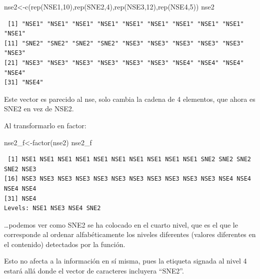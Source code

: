\documentclass[
  letterpaper,
  DIV=11,
  numbers=noendperiod]{scrreprt}
\newenvironment{Shaded}{\begin{snugshade}}{\end{snugshade}}
\newcommand{\DecValTok}[1]{\textcolor[rgb]{0.68,0.00,0.00}{#1}}
\newcommand{\FunctionTok}[1]{\textcolor[rgb]{0.28,0.35,0.67}{#1}}
\newcommand{\NormalTok}[1]{\textcolor[rgb]{0.00,0.23,0.31}{#1}}
\newcommand{\OtherTok}[1]{\textcolor[rgb]{0.00,0.23,0.31}{#1}}
\newcommand{\StringTok}[1]{\textcolor[rgb]{0.13,0.47,0.30}{#1}}
\begin{document}
\begin{Shaded}
\begin{Highlighting}[]
\NormalTok{nse2}\OtherTok{\textless{}{-}}\FunctionTok{c}\NormalTok{(}\FunctionTok{rep}\NormalTok{(}\StringTok{\textquotesingle{}NSE1\textquotesingle{}}\NormalTok{,}\DecValTok{10}\NormalTok{),}\FunctionTok{rep}\NormalTok{(}\StringTok{\textquotesingle{}SNE2\textquotesingle{}}\NormalTok{,}\DecValTok{4}\NormalTok{),}\FunctionTok{rep}\NormalTok{(}\StringTok{\textquotesingle{}NSE3\textquotesingle{}}\NormalTok{,}\DecValTok{12}\NormalTok{),}\FunctionTok{rep}\NormalTok{(}\StringTok{\textquotesingle{}NSE4\textquotesingle{}}\NormalTok{,}\DecValTok{5}\NormalTok{))}
\NormalTok{nse2}
\end{Highlighting}
\end{Shaded}

\begin{verbatim}
 [1] "NSE1" "NSE1" "NSE1" "NSE1" "NSE1" "NSE1" "NSE1" "NSE1" "NSE1" "NSE1"
[11] "SNE2" "SNE2" "SNE2" "SNE2" "NSE3" "NSE3" "NSE3" "NSE3" "NSE3" "NSE3"
[21] "NSE3" "NSE3" "NSE3" "NSE3" "NSE3" "NSE3" "NSE4" "NSE4" "NSE4" "NSE4"
[31] "NSE4"
\end{verbatim}

Este vector es parecido al nse, solo cambia la cadena de 4 elementos,
que ahora es SNE2 en vez de NSE2.

Al transformarlo en factor:

\begin{Shaded}
\begin{Highlighting}[]
\NormalTok{nse2\_f}\OtherTok{\textless{}{-}}\FunctionTok{factor}\NormalTok{(nse2)}
\NormalTok{nse2\_f}
\end{Highlighting}
\end{Shaded}

\begin{verbatim}
 [1] NSE1 NSE1 NSE1 NSE1 NSE1 NSE1 NSE1 NSE1 NSE1 NSE1 SNE2 SNE2 SNE2 SNE2 NSE3
[16] NSE3 NSE3 NSE3 NSE3 NSE3 NSE3 NSE3 NSE3 NSE3 NSE3 NSE3 NSE4 NSE4 NSE4 NSE4
[31] NSE4
Levels: NSE1 NSE3 NSE4 SNE2
\end{verbatim}

\ldots podemos ver como SNE2 se ha colocado en el cuarto nivel, que es
el que le corresponde al ordenar alfabéticamente los niveles diferentes
(valores diferentes en el contenido) detectados por la función.

Esto no afecta a la información en sí misma, pues la etiqueta signada al
nivel 4 estará allá donde el vector de caracteres incluyera ``SNE2''.
\end{document}
